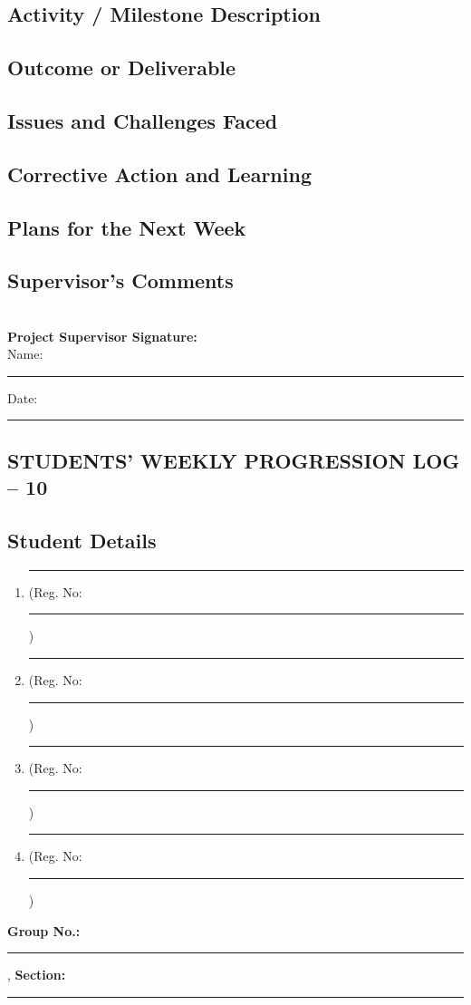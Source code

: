 \documentclass[a4paper]{article}
\begin{document}
				 
\subsection*{Activity / Milestone Description}
\framebox[\textwidth][c]{\rule{0pt}{4cm}}

\subsection*{Outcome or Deliverable}
\framebox[\textwidth][c]{\rule{0pt}{4cm}}


\subsection*{Issues and Challenges Faced}
\framebox[\textwidth][c]{\rule{0pt}{4cm}}


\subsection*{Corrective Action and Learning}
\framebox[\textwidth][c]{\rule{0pt}{4cm}}


\subsection*{Plans for the Next Week}
\framebox[\textwidth][c]{\rule{0pt}{4cm}}

\subsection*{Supervisor's Comments}
\framebox[\textwidth][c]{\rule{0pt}{4cm}}\\[2em]

\vfill
\textbf{Project Supervisor Signature:}\\[1em]
Name: \rule{6cm}{0.4pt} \hfill Date: \rule{4cm}{0.4pt}


\newpage
\begin{center}
\section*{STUDENTS' WEEKLY PROGRESSION LOG -- 10}
\end{center}
\subsection*{Student Details}
\begin{enumerate}[itemsep=0em]
\item \rule{8cm}{0.4pt} (Reg. No:\rule{2cm}{0.4pt})
\item \rule{8cm}{0.4pt} (Reg. No:\rule{2cm}{0.4pt})
\item \rule{8cm}{0.4pt} (Reg. No:\rule{2cm}{0.4pt})
\item \rule{8cm}{0.4pt} (Reg. No:\rule{2cm}{0.4pt})
\end{enumerate}
\textbf{Group No.:} \rule{4cm}{0.4pt}, \textbf{Section:} \rule{3.5cm}{0.4pt}
\end{document}
